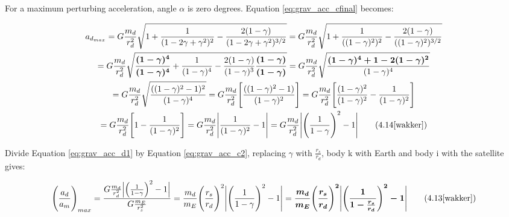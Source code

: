 \bigskip

\noindent For a maximum perturbing acceleration, angle $\alpha$ is zero degrees. Equation \ref{eq:grav_acc_cfinal} becomes:

\begin{multline}
    a_{d_{max}} = G \frac{m_{d}}{r_{d}^2} \sqrt{1 + \frac{1}{(1 - 2 \gamma + \gamma^2)^2} - \frac{2(1 - \gamma) }{(1 - 2 \gamma + \gamma^2)^{3/2}}} = G \frac{m_{d}}{r_{d}^2} \sqrt{1 + \frac{1}{((1 - \gamma)^2)^2} - \frac{2(1 - \gamma) }{((1 - \gamma)^2)^{3/2}}} \\
    = G \frac{m_{d}}{r_{d}^2} \sqrt{\boldsymbol{\frac{(1 - \gamma)^4}{(1 - \gamma)^4}} + \frac{1}{(1 - \gamma)^4} - \frac{2(1 - \gamma) }{(1 - \gamma)^3}\boldsymbol{\frac{(1 - \gamma)}{(1 - \gamma)}}}
    = G \frac{m_{d}}{r_{d}^2} \sqrt{\frac{\boldsymbol{(1 - \gamma)^4 + 1 - 2(1 - \gamma)^2}}{(1 - \gamma)^4}} \\
    = G \frac{m_{d}}{r_{d}^2} \sqrt{\frac{((1 - \gamma)^2 - 1)^2}{(1 - \gamma)^4}}
    = G \frac{m_{d}}{r_{d}^2} \Bigg[ \frac{((1 - \gamma)^2 - 1)}{(1 - \gamma)^2} \Bigg]
    = G \frac{m_{d}}{r_{d}^2} \Bigg[ \frac{(1 - \gamma)^2}{(1 - \gamma)^2} - \frac{1}{(1 - \gamma)^2} \Bigg] \\
    = G \frac{m_{d}}{r_{d}^2} \Bigg[ 1 - \frac{1}{(1 - \gamma)^2} \Bigg]
    = G \frac{m_{d}}{r_{d}^2} \Bigg| \frac{1}{(1 - \gamma)^2} - 1 \Bigg|
    = G \frac{m_{d}}{r_{d}^2} \Bigg| \Bigg( \frac{1}{1 - \gamma} \Bigg) ^2 - 1 \Bigg|
    \tag{4.14\cite{wakker}}
    \label{eq:grav_acc_d1}
\end{multline}

\noindent Divide Equation \ref{eq:grav_acc_d1} by Equation \ref{eq:grav_acc_c2}, replacing $\gamma$ with $\frac{r_{s}}{r_{d}}$, body k with Earth and body i with the satellite gives:

\begin{equation}
    \Bigg( \frac{a_{d}}{a_{m}} \Bigg)_{max} = \frac{G \frac{m_{d}}{r_{d}^2} \Big| \Big( \frac{1}{1 - \gamma} \Big) ^2 - 1 \Big| }{G\frac{m_{E}}{r_{s}^2}} = \frac{m_{d}}{m_{E}} \Bigg( \frac{r_{s}}{r_{d}} \Bigg)^2 \Bigg| \Bigg( \frac{1}{1 - \gamma} \Bigg) ^2 - 1 \Bigg| = \boldsymbol{\frac{m_{d}}{m_{E}} \Bigg( \frac{r_{s}}{r_{d}} \Bigg)^2 \Bigg| \Bigg( \frac{1}{1 - \frac{r_{s}}{r_{d}}} \Bigg) ^2 - 1 \Bigg|}
    \tag{4.13\cite{wakker}}
    \label{eq:grav_acc_d2}
\end{equation}










